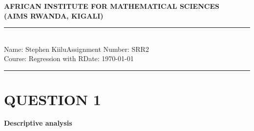\documentclass[12pt,a4paper]{article}
\newcommand{\student}{Stephen Kiilu}
\newcommand{\course}{Regression with R}
\newcommand{\assignment}{SRR2}
\begin{document}
\thispagestyle{empty}
\begin{center}
\textbf{AFRICAN INSTITUTE FOR MATHEMATICAL SCIENCES \\[0.5cm]
(AIMS RWANDA, KIGALI)}
\vspace{1.0cm}
\end{center}

\noindent
\rule{17cm}{0.2cm}\\[0.3cm]
Name: \student \hfill Assignment Number: \assignment\\[0.1cm]
Course: \course \hfill Date: \today\\
\rule{17cm}{0.05cm}
\vspace{1.0cm}
\section{QUESTION 1}
\textbf{Descriptive analysis}\\
\end{document}
